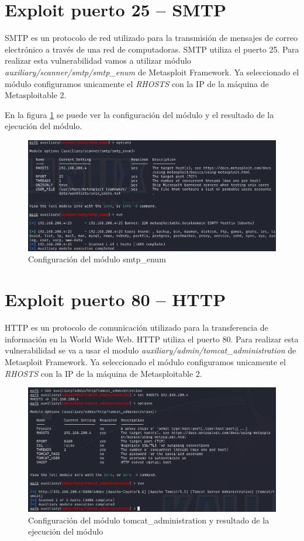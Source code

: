 \documentclass[11pt]{report}
\begin{document}
\section{Exploit puerto 25 – SMTP}
SMTP es un protocolo de red utilizado para la transmisión de mensajes de correo electrónico a través de una red de computadoras. SMTP utiliza el puerto 25. Para realizar esta vulnerabilidad
vamos a utilizar módulo \emph{auxiliary/scanner/smtp/smtp\_enum} de Metasploit Framework. Ya seleccionado el módulo configuramos unicamente el \emph{RHOSTS} con la IP de la máquina de Metasploitable 2.

En la figura \ref{fig:Configuración del módulo smtp_enum} se puede ver la configuración del módulo y el resultado de la ejecución del módulo.
\begin{figure}[H]
  \centering
  \includegraphics[scale=0.6]{img/smtp.png}
  \caption{Configuración del módulo smtp\_enum}
  \label{fig:Configuración del módulo smtp_enum}
\end{figure}

\section{Exploit puerto 80 – HTTP}
HTTP es un protocolo de comunicación utilizado para la transferencia de información en la World Wide Web. HTTP utiliza el puerto 80. Para realizar esta vulnerabilidad
se va a usar el modulo \emph{auxiliary/admin/tomcat\_administration} de Metasploit Framework. Ya seleccionado el módulo configuramos unicamente el \emph{RHOSTS} con la IP de la máquina de Metasploitable 2.
\begin{figure}[H]
  \centering
  \includegraphics[scale=0.6]{img/http.png}
  \caption{Configuración del módulo tomcat\_administration y resultado de la ejecución del módulo}
\end{figure}
\end{document}
